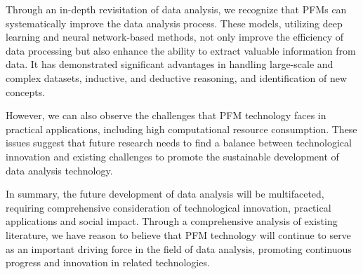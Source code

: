   Through an in-depth revisitation of data analysis, we recognize that PFMs can systematically improve the data analysis process. These models, utilizing deep learning and neural network-based methods, not only improve the efficiency of data processing but also enhance the ability to extract valuable information from data. It has demonstrated significant advantages in handling large-scale and complex datasets, inductive, and deductive reasoning, and identification of new concepts.
  
  However, we can also observe the challenges that PFM technology faces in practical applications, including high computational resource consumption. These issues suggest that future research needs to find a balance between technological innovation and existing challenges to promote the sustainable development of data analysis technology.
  
  
  In summary, the future development of data analysis will be multifaceted, requiring comprehensive consideration of technological innovation, practical applications and social impact. Through a comprehensive analysis of existing literature, we have reason to believe that PFM technology will continue to serve as an important driving force in the field of data analysis, promoting continuous progress and innovation in related technologies.
  
  
  
  \printbibliography
  
  
  
  
  